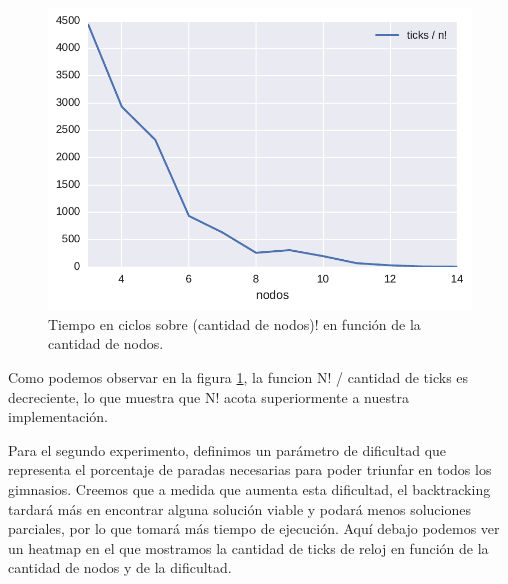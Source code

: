 \begin{figure}[H]
  \begin{center}
    \includegraphics{../experimentacion/ej1/ej1_complejidad.pdf}
    \caption{Tiempo en ciclos sobre (cantidad de nodos)! en función de la cantidad de nodos.}
    \label{fig:ej1_complejidad}
  \end{center}
\end{figure}

Como podemos observar en la figura \ref{fig:ej1_complejidad}, la funcion N! / cantidad de ticks es decreciente, lo que muestra que N! acota superiormente a nuestra implementación.


Para el segundo experimento, definimos un parámetro de dificultad que representa el porcentaje de paradas necesarias para poder triunfar en todos los gimnasios. Creemos que a medida que aumenta esta dificultad, el backtracking tardará más en encontrar alguna solución viable y podará menos soluciones parciales, por lo que tomará más tiempo de ejecución.
Aquí debajo podemos ver un heatmap en el que mostramos la cantidad de ticks de reloj en función de la cantidad de nodos y de la dificultad.

